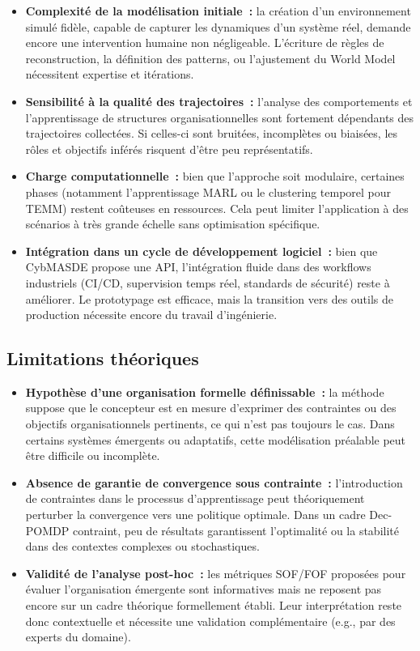 \begin{itemize}
    \item \textbf{Complexité de la modélisation initiale~:} la création d’un environnement simulé fidèle, capable de capturer les dynamiques d’un système réel, demande encore une intervention humaine non négligeable. L’écriture de règles de reconstruction, la définition des patterns, ou l’ajustement du World Model nécessitent expertise et itérations.

    \item \textbf{Sensibilité à la qualité des trajectoires~:} l’analyse des comportements et l’apprentissage de structures organisationnelles sont fortement dépendants des trajectoires collectées. Si celles-ci sont bruitées, incomplètes ou biaisées, les rôles et objectifs inférés risquent d’être peu représentatifs.

    \item \textbf{Charge computationnelle~:} bien que l’approche soit modulaire, certaines phases (notamment l’apprentissage MARL ou le clustering temporel pour TEMM) restent coûteuses en ressources. Cela peut limiter l’application à des scénarios à très grande échelle sans optimisation spécifique.

    \item \textbf{Intégration dans un cycle de développement logiciel~:} bien que CybMASDE propose une API, l’intégration fluide dans des workflows industriels (CI/CD, supervision temps réel, standards de sécurité) reste à améliorer. Le prototypage est efficace, mais la transition vers des outils de production nécessite encore du travail d’ingénierie.
\end{itemize}

\subsection*{Limitations théoriques}

\begin{itemize}
    \item \textbf{Hypothèse d’une organisation formelle définissable~:} la méthode suppose que le concepteur est en mesure d’exprimer des contraintes ou des objectifs organisationnels pertinents, ce qui n’est pas toujours le cas. Dans certains systèmes émergents ou adaptatifs, cette modélisation préalable peut être difficile ou incomplète.

    \item \textbf{Absence de garantie de convergence sous contrainte~:} l’introduction de contraintes dans le processus d’apprentissage peut théoriquement perturber la convergence vers une politique optimale. Dans un cadre Dec-POMDP contraint, peu de résultats garantissent l’optimalité ou la stabilité dans des contextes complexes ou stochastiques.

    \item \textbf{Validité de l’analyse post-hoc~:} les métriques SOF/FOF proposées pour évaluer l’organisation émergente sont informatives mais ne reposent pas encore sur un cadre théorique formellement établi. Leur interprétation reste donc contextuelle et nécessite une validation complémentaire (e.g., par des experts du domaine).
\end{itemize}

